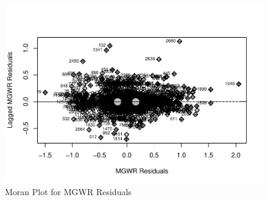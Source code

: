 \documentclass[
]{article}
\begin{document}
\begin{table}[H]
\renewcommand{\arraystretch}{1.3} %
\setlength{\tabcolsep}{12pt} %
\centering
\caption{MGWR Residual Moran's I Test Results}
\label{tab:mgwr_morans_i}
\end{table}

\newpage

\begin{figure}[H]

{\centering \includegraphics[width=1\linewidth]{final-project-write-up-nathan-nguyen_files/figure-latex/unnamed-chunk-17-1} 

}

\caption{Moran Plot for MGWR Residuals}\label{fig:unnamed-chunk-17}
\end{figure}
\end{document}

